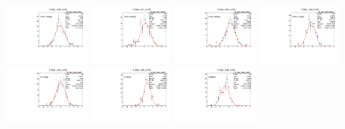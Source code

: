 \begin{figure}[h]\centering
    \includegraphics[width=0.24\textwidth]{figure/io_full_sim/fitfrac/pull_fitfrac_res0_comb.pdf}
    \includegraphics[width=0.24\textwidth]{figure/io_full_sim/fitfrac/pull_fitfrac_res1_comb.pdf}
    \includegraphics[width=0.24\textwidth]{figure/io_full_sim/fitfrac/pull_fitfrac_res2_comb.pdf}
    \includegraphics[width=0.24\textwidth]{figure/io_full_sim/fitfrac/pull_fitfrac_res3_comb.pdf}
    \includegraphics[width=0.24\textwidth]{figure/io_full_sim/fitfrac/pull_fitfrac_res4_comb.pdf}
    \includegraphics[width=0.24\textwidth]{figure/io_full_sim/fitfrac/pull_fitfrac_res5_comb.pdf}
    \includegraphics[width=0.24\textwidth]{figure/io_full_sim/fitfrac/pull_fitfrac_res6_comb.pdf}

\end{figure}

